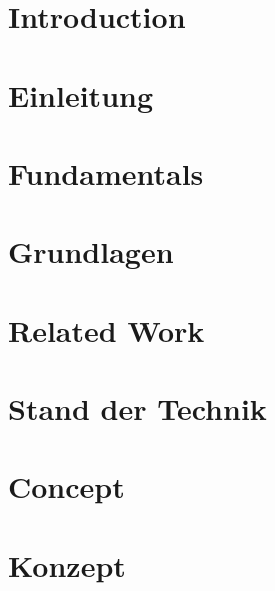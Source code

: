 \documentclass[oneside,11pt,a4paper,twoside]{scrreprt}
\begin{document}
\setcounter{page}{1}
\pagestyle{headings}
\renewcommand{\baselinestretch}{1.3}
\small\normalsize
\tableofcontents
\renewcommand{\baselinestretch}{1}
\small\normalsize
\cleardoublepage
\setcounter{page}{1}

\begin{onehalfspace}
	{\chapter{Introduction}}
	{\chapter{Einleitung}}
\label{cha:introduction}

\cleardoublepage

	{\chapter{Fundamentals}}
	{\chapter{Grundlagen}}
\label{cha:fundamentals}

\cleardoublepage

	{\chapter{Related Work}}
	{\chapter{Stand der Technik}}
\label{cha:related_work}

\cleardoublepage

	{\chapter{Concept}}
	{\chapter{Konzept}}
\label{cha:concept}

\cleardoublepage


\end{onehalfspace}
\end{document}
